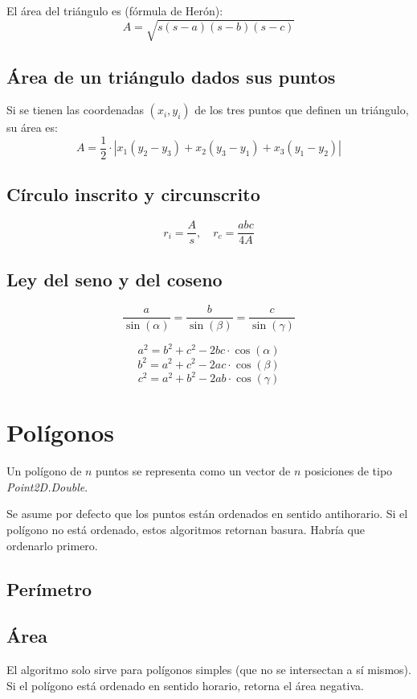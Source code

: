 \documentclass{article}
\begin{document}
\begin{multicols}{2}
El área del triángulo es (fórmula de Herón):
\[ A = \sqrt{s(s-a)(s-b)(s-c)} \]

\subsection{Área de un triángulo dados sus puntos}
Si se tienen las coordenadas \( (x_i, y_i) \) de los tres puntos que definen un triángulo, su área es:
\[ A = \frac{1}{2} \cdot | x_1(y_2-y_3) + x_2(y_3-y_1) + x_3(y_1-y_2) | \]

\subsection{Círculo inscrito y circunscrito}
\[ r_i = \frac{A}{s}, \quad r_c = \frac{abc}{4A} \]

\subsection{Ley del seno y del coseno}
\[ \frac{a}{\sin(\alpha)} = \frac{b}{\sin(\beta)} = \frac{c}{\sin(\gamma)} \]

\[ a^2 = b^2 + c^2 - 2bc \cdot \cos(\alpha) \]
\[ b^2 = a^2 + c^2 - 2ac \cdot \cos(\beta) \]
\[ c^2 = a^2 + b^2 - 2ab \cdot \cos(\gamma) \]


\section{Polígonos}
Un polígono de \( n \) puntos se representa como un vector de \( n \) posiciones de tipo  \emph{Point2D.Double}. 

Se asume por defecto que los puntos están ordenados en sentido antihorario. Si el polígono no está ordenado, estos algoritmos retornan basura. Habría que ordenarlo primero.

\subsection{Perímetro}


\subsection{Área}
El algoritmo solo sirve para polígonos simples (que no se intersectan a sí mismos). Si el polígono está ordenado en sentido horario, retorna el área negativa.



\end{multicols}
\end{document}
